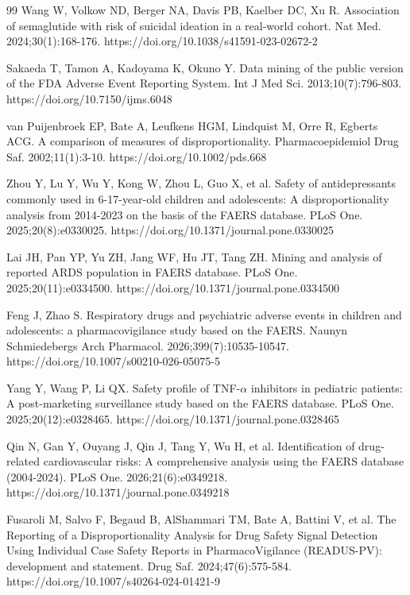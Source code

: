 \documentclass[10pt,a4paper]{article}
\begin{document}
\begin{thebibliography}{99}
Wang W, Volkow ND, Berger NA, Davis PB, Kaelber DC, Xu R.
Association of semaglutide with risk of suicidal ideation in a real-world cohort.
Nat Med. 2024;30(1):168-176.
https://doi.org/10.1038/s41591-023-02672-2

Sakaeda T, Tamon A, Kadoyama K, Okuno Y.
Data mining of the public version of the FDA Adverse Event Reporting System.
Int J Med Sci. 2013;10(7):796-803.
https://doi.org/10.7150/ijms.6048

van Puijenbroek EP, Bate A, Leufkens HGM, Lindquist M, Orre R, Egberts ACG.
A comparison of measures of disproportionality.
Pharmacoepidemiol Drug Saf. 2002;11(1):3-10.
https://doi.org/10.1002/pds.668

Zhou Y, Lu Y, Wu Y, Kong W, Zhou L, Guo X, et al.
Safety of antidepressants commonly used in 6-17-year-old children and adolescents: A disproportionality analysis from 2014-2023 on the basis of the FAERS database.
PLoS One. 2025;20(8):e0330025.
https://doi.org/10.1371/journal.pone.0330025

Lai JH, Pan YP, Yu ZH, Jang WF, Hu JT, Tang ZH.
Mining and analysis of reported ARDS population in FAERS database.
PLoS One. 2025;20(11):e0334500.
https://doi.org/10.1371/journal.pone.0334500

Feng J, Zhao S.
Respiratory drugs and psychiatric adverse events in children and adolescents: a pharmacovigilance study based on the FAERS.
Naunyn Schmiedebergs Arch Pharmacol. 2026;399(7):10535-10547.
https://doi.org/10.1007/s00210-026-05075-5

Yang Y, Wang P, Li QX. Safety profile of TNF-$\alpha$ inhibitors in pediatric patients: A post-marketing surveillance study based on the FAERS database. PLoS One. 2025;20(12):e0328465.
https://doi.org/10.1371/journal.pone.0328465

Qin N, Gan Y, Ouyang J, Qin J, Tang Y, Wu H, et al. Identification of drug-related cardiovascular risks: A comprehensive analysis using the FAERS database (2004-2024). PLoS One. 2026;21(6):e0349218. https://doi.org/10.1371/journal.pone.0349218

Fusaroli M, Salvo F, Begaud B, AlShammari TM, Bate A, Battini V, et al.
The Reporting of a Disproportionality Analysis for Drug Safety Signal Detection Using Individual Case Safety Reports in PharmacoVigilance (READUS-PV): development and statement.
Drug Saf. 2024;47(6):575-584.
https://doi.org/10.1007/s40264-024-01421-9


\end{thebibliography}
\end{document}
